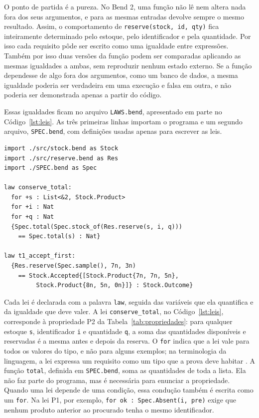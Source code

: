 O ponto de partida é a pureza. No Bend 2, uma função não lê nem altera nada fora dos seus argumentos, e para as mesmas entradas devolve sempre o mesmo resultado. Assim, o comportamento de \texttt{reserve(stock, id, qty)} fica inteiramente determinado pelo estoque, pelo identificador e pela quantidade. Por isso cada requisito pôde ser escrito como uma igualdade entre expressões. Também por isso duas versões da função podem ser comparadas aplicando as mesmas igualdades a ambas, sem reproduzir nenhum estado externo. Se a função dependesse de algo fora dos argumentos, como um banco de dados, a mesma igualdade poderia ser verdadeira em uma execução e falsa em outra, e não poderia ser demonstrada apenas a partir do código.

Essas igualdades ficam no arquivo \texttt{LAWS.bend}, apresentado em parte no Código~\ref{lst:leis}. As três primeiras linhas importam o programa e um segundo arquivo, \texttt{SPEC.bend}, com definições usadas apenas para escrever as leis.

\begin{lstlisting}[caption={Trechos do arquivo de leis.},label={lst:leis}]
import ./src/stock.bend as Stock
import ./src/reserve.bend as Res
import ./SPEC.bend as Spec

law conserve_total:
  for +s : List<&2, Stock.Product>
  for +i : Nat
  for +q : Nat
  {Spec.total(Spec.stock_of(Res.reserve(s, i, q)))
    == Spec.total(s) : Nat}

law t1_accept_first:
  {Res.reserve(Spec.sample(), 7n, 3n)
    == Stock.Accepted{[Stock.Product{7n, 7n, 5n},
         Stock.Product{8n, 5n, 0n}]} : Stock.Outcome}
\end{lstlisting}

Cada lei é declarada com a palavra \texttt{law}, seguida das variáveis que ela quantifica e da igualdade que deve valer. A lei \texttt{conserve\_total}, no Código~\ref{lst:leis}, corresponde à propriedade P2 da Tabela~\ref{tab:propriedades}: para qualquer estoque \texttt{s}, identificador \texttt{i} e quantidade \texttt{q}, a soma das quantidades disponíveis e reservadas é a mesma antes e depois da reserva. O \texttt{for} indica que a lei vale para todos os valores do tipo, e não para alguns exemplos; na terminologia da linguagem, a lei expressa um requisito como um tipo que a prova deve habitar \cite{BendLearn}. A função \texttt{total}, definida em \texttt{SPEC.bend}, soma as quantidades de toda a lista. Ela não faz parte do programa, mas é necessária para enunciar a propriedade. Quando uma lei depende de uma condição, essa condução também é escrita como um \texttt{for}. Na lei P1, por exemplo, \texttt{for ok : Spec.Absent(i, pre)} exige que nenhum produto anterior ao procurado tenha o mesmo identificador.

